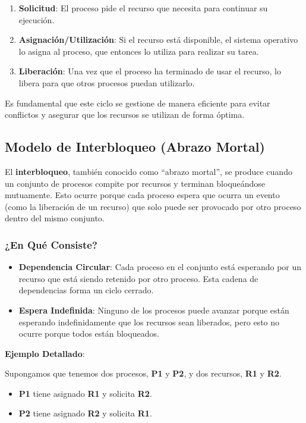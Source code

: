 \begin{enumerate}
	\item \textbf{Solicitud}: El proceso pide el recurso que necesita para continuar su ejecución.
	\item \textbf{Asignación/Utilización}: Si el recurso está disponible, el sistema operativo lo asigna al proceso, que entonces lo utiliza para realizar su tarea.
	\item \textbf{Liberación}: Una vez que el proceso ha terminado de usar el recurso, lo libera para que otros procesos puedan utilizarlo.
\end{enumerate}

Es fundamental que este ciclo se gestione de manera eficiente para evitar conflictos y asegurar que los recursos se utilizan de forma óptima.

\subsection{Modelo de Interbloqueo (Abrazo Mortal)}

El \textbf{interbloqueo}, también conocido como ``abrazo mortal'',  se produce cuando un conjunto de procesos compite por recursos y terminan bloqueándose mutuamente. Esto ocurre porque cada proceso espera que ocurra un evento (como la liberación de un recurso) que solo puede ser provocado por otro proceso dentro del mismo conjunto.

\subsubsection{¿En Qué Consiste?}

\begin{itemize}
	\item \textbf{Dependencia Circular}: Cada proceso en el conjunto está esperando por un recurso que está siendo retenido por otro proceso. Esta cadena de dependencias forma un ciclo cerrado.
	\item \textbf{Espera Indefinida}: Ninguno de los procesos puede avanzar porque están esperando indefinidamente que los recursos sean liberados, pero esto no ocurre porque todos están bloqueados.
\end{itemize}

\textbf{Ejemplo Detallado}:

Supongamos que tenemos dos procesos, \textbf{P1} y \textbf{P2}, y dos recursos, \textbf{R1} y \textbf{R2}.

\begin{itemize}
	\item \textbf{P1} tiene asignado \textbf{R1} y solicita \textbf{R2}.
	\item \textbf{P2} tiene asignado \textbf{R2} y solicita \textbf{R1}.
\end{itemize}

